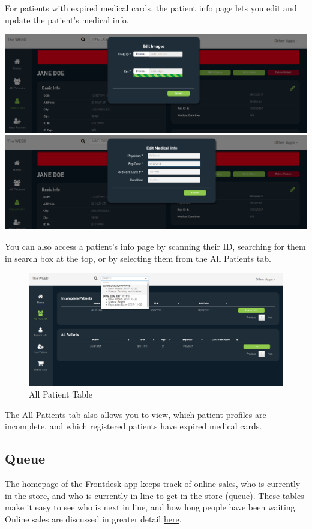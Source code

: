 \documentclass[]{book}
\theoremstyle{definition}
\theoremstyle{definition}
\theoremstyle{definition}
\theoremstyle{remark}
\begin{document}
For patients with expired medical cards, the patient info page lets you
edit and update the patient's medical info.

\includegraphics{images/edit1.png} \includegraphics{images/edit2.png}

You can also access a patient's info page by scanning their ID,
searching for them in search box at the top, or by selecting them from
the All Patients tab.

\begin{figure}
\centering
\includegraphics{images/allPatients.png}
\caption{All Patient Table}
\end{figure}

The All Patients tab also allows you to view, which patient profiles are
incomplete, and which registered patients have expired medical cards.

\subsection{Queue}\label{queue}

The homepage of the Frontdesk app keeps track of online sales, who is
currently in the store, and who is currently in line to get in the store
(queue). These tables make it easy to see who is next in line, and how
long people have been waiting. Online sales are discussed in greater
detail \protect\hyperlink{online-orders}{here}.
\end{document}
